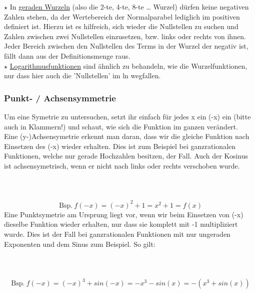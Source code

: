 		\(\star\) In \underline{geraden Wurzeln} (also die 2-te, 4-te, 8-te \ldots
		Wurzel) dürfen keine negativen Zahlen stehen, da der Wertebereich der
		Normalparabel lediglich im positiven definiert ist. Hierzu ist es hilfreich,
		sich wieder die Nullstellen zu suchen und Zahlen zwischen zwei Nullstellen
		einzusetzen, bzw. links oder rechts von ihnen. Jeder Bereich zwischen den
		Nullstellen des Terms in der Wurzel der negativ ist, fällt dann aus der
		Definitionsmenge raus.\\

		\(\star\) \underline{Logarithmusfunktionen} sind ähnlich zu behandeln, wie die
		Wurzelfunktionen, nur dass hier auch die 'Nullstellen' im ln wegfallen.

	\subsubsection{Punkt- / Achsensymmetrie}
		Um eine Symetrie zu untersuchen, setzt ihr einfach für jedes x ein (-x) ein
		(bitte auch in Klammern!) und schaut, wie sich die Funktion im ganzen
		verändert.\\
		Eine (y-)Achsensymetrie erkennt man daran, dass wir die gleiche Funktion nach
		Einsetzen des (-x) wieder erhalten. Dies ist zum Beispiel bei ganzrationalen
		Funktionen, welche nur gerade Hochzahlen besitzen, der Fall. Auch der Kosinus
		ist achsensymetrisch, wenn er nicht nach links oder rechts verschoben wurde.
		\\ \\
		\formel{\[f(-x)=f(x),\]}
		\\ \\
		\[\mathrm{\ Bsp.\ } f(-x)=(-x)^2+1=x^2+1=f(x)\]
		Eine Punktsymetrie am Ursprung liegt vor, wenn wir beim Einsetzen von (-x) dieselbe Funktion wieder erhalten, nur dass sie komplett mit -1 multipliziert
		wurde. Dies ist der Fall bei ganzrationalen Funktionen mit nur ungeraden
		Exponenten und dem Sinus zum Beispiel. So gilt:
		\\ \\
		\formel{\[f(-x)=-f(x),\]}
		\\ \\
		\[\mathrm{\ Bsp.\ }
		f(-x)=(-x)^3+sin(-x)=-x^3-sin(x)=-(x^3+sin(x))\]
		

